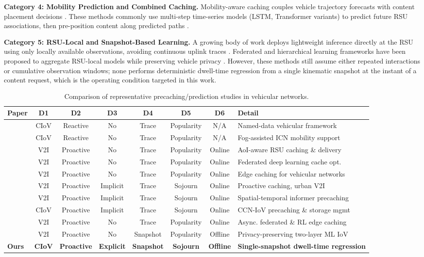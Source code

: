 \documentclass[journal]{IEEEtran}
\begin{document}
\textbf{Category 4: Mobility Prediction and Combined Caching.}
Mobility-aware caching couples vehicle trajectory forecasts with content placement decisions \cite{39,42,43}.
These methods commonly use multi-step time-series models (LSTM, Transformer variants) to predict
future RSU associations, then pre-position content along predicted paths \cite{41,45}.

\textbf{Category 5: RSU-Local and Snapshot-Based Learning.}
A growing body of work deploys lightweight inference directly at the RSU using only locally available
observations, avoiding continuous uplink traces \cite{64,68,71}.
Federated and hierarchical learning frameworks have been proposed to aggregate RSU-local models
while preserving vehicle privacy \cite{60,61,67}.
However, these methods still assume either repeated interactions or cumulative observation windows;
none performs deterministic dwell-time regression from a single kinematic snapshot at the instant
of a content request, which is the operating condition targeted in this work.

\begin{table}[!t]
\centering
\caption{Comparison of representative precaching/prediction studies in vehicular networks.}
\label{tab:related_work}
\begin{tabular}{@{}lccccccl@{}}
\toprule
\textbf{Paper} & \textbf{D1} & \textbf{D2} & \textbf{D3} & \textbf{D4} & \textbf{D5} & \textbf{D6} & \textbf{Detail} \\
\midrule
\cite{1}  & CIoV & Reactive  & No  & Trace    & Popularity & N/A     & Named-data vehicular framework \\
\cite{3}  & CIoV & Reactive  & No  & Trace    & Popularity & N/A     & Fog-assisted ICN mobility support \\
\cite{15} & V2I  & Proactive & No  & Trace    & Popularity & Online  & AoI-aware RSU caching \& delivery \\
\cite{17} & V2I  & Proactive & No  & Trace    & Popularity & Online  & Federated deep learning cache opt. \\
\cite{32} & V2I  & Proactive & No  & Trace    & Popularity & Online  & Edge caching for vehicular networks \\
\cite{39} & V2I  & Proactive & Implicit & Trace & Sojourn  & Online  & Proactive caching, urban V2I \\
\cite{42} & V2I  & Proactive & Implicit & Trace & Sojourn  & Online  & Spatial-temporal informer precaching \\
\cite{45} & CIoV & Proactive & Implicit & Trace & Sojourn  & Online  & CCN-IoV precaching \& storage mgmt \\
\cite{48} & V2I  & Proactive & No  & Trace    & Popularity & Online  & Async. federated \& RL edge caching \\
\cite{64} & V2I  & Proactive & No  & Snapshot & Popularity & Offline & Privacy-preserving two-layer ML IoV \\
\textbf{Ours} & \textbf{CIoV} & \textbf{Proactive} & \textbf{Explicit} & \textbf{Snapshot} & \textbf{Sojourn} & \textbf{Offline} & \textbf{Single-snapshot dwell-time regression} \\
\bottomrule
\end{tabular}
\end{table}
\end{document}
